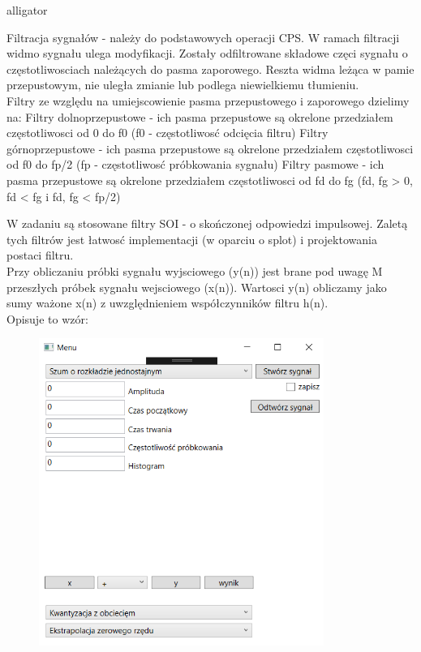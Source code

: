 \documentclass[12pt]{article}
\begin{document}
\begin{labeling}{alligator}

\item [Filtracja sygnałów]  - należy do podstawowych operacji CPS. W ramach filtracji widmo sygnału ulega modyfikacji. Zostały odfiltrowane składowe częci sygnału o częstotliwosciach należących do pasma zaporowego. Reszta widma leżąca w pamie przepustowym, nie uległa zmianie lub podlega niewielkiemu tłumieniu. 
\\Filtry ze względu na umiejscowienie pasma przepustowego i zaporowego dzielimy na:
\subitem Filtry dolnoprzepustowe - ich pasma przepustowe są okrelone przedziałem częstotliwosci od 0 do f0 (f0 - częstotliwosć odcięcia filtru) 
\subitem Filtry górnoprzepustowe - ich pasma przepustowe są okrelone przedziałem częstotliwosci od f0 do fp/2 (fp - częstotliwosć próbkowania sygnału) 
\subitem Filtry pasmowe - ich pasma przepustowe są okrelone przedziałem częstotliwosci od fd do fg (fd, fg > 0, fd < fg i fd, fg < fp/2) 

W zadaniu są stosowane filtry SOI - o skończonej odpowiedzi impulsowej. Zaletą tych filtrów jest łatwosć implementacji (w oparciu o splot) i projektowania postaci filtru. 
\\Przy obliczaniu próbki sygnału wyjsciowego (y(n)) jest brane pod uwagę M przeszłych próbek sygnału wejsciowego (x(n)). Wartosci y(n) obliczamy jako sumy ważone x(n) z uwzględnieniem współczynników filtru h(n). 
\\Opisuje to wzór:

\begin{figure}[h!]
 \centering
 \includegraphics[width=9.3cm]{ui1.PNG}
 \vspace{-0.3cm}
 \label{Splot_indeks}
\end{figure}


\end{labeling}
\end{document}
